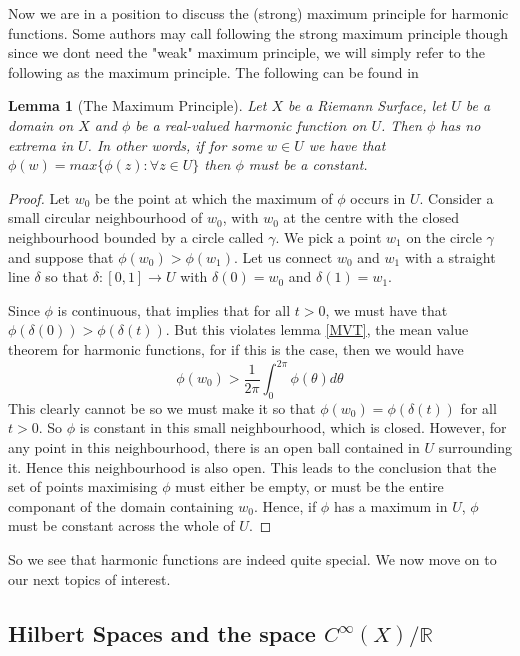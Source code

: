 \documentclass[a4paper,12pt]{report}
\theoremstyle{plain}
\newtheorem{lemma}[thm]{Lemma}
\theoremstyle{definition}
\begin{document}
Now we are in a position to discuss the (strong) maximum principle for harmonic functions. Some authors may call following the strong maximum principle though since we dont need the "weak" maximum principle, we will simply refer to the following as the maximum principle.
The following can be found in \cite{arnold}
\begin{lemma}[The Maximum Principle]\label{MaximumPrincipleDef}
  Let $X$ be a Riemann Surface, let $U$ be a domain on $X$ and $\phi$ be a real-valued harmonic function on $U$. Then $\phi$ has no extrema in $U$. In other words, if for some $w \in U$ we have that $\phi(w) = max\{\phi(z) \colon \forall z \in U\}$ then $\phi$ must be a constant.
\end{lemma}
\begin{proof}
  Let $w_0$ be the point at which the maximum of $\phi$ occurs in $U$. Consider a small circular neighbourhood of $w_0$, with $w_0$ at the centre with the closed neighbourhood bounded by a circle called $\gamma$. We pick a point $w_1$ on the circle $\gamma$ and suppose that $\phi(w_0)>\phi(w_1)$. Let us connect $w_0$ and $w_1$ with a straight line $\delta$ so that $\delta:[0,1] \rightarrow U$ with $\delta(0)=w_0$ and $\delta(1)=w_1$.
  
  Since $\phi$ is continuous, that implies that for all $t > 0$, we must have that $\phi(\delta(0)) > \phi(\delta(t))$. But this violates lemma \ref{MVT}, the mean value theorem for harmonic functions, for if this is the case, then we would have 
  \[ \phi(w_0) > \frac{1}{2\pi}\int_0^{2\pi}\phi(\theta)d\theta \]
  This clearly cannot be so we must make it so that $\phi(w_0) = \phi(\delta(t))$ for all $t > 0$. So $\phi$ is constant in this small neighbourhood, which is closed. However, for any point in this neighbourhood, there is an open ball contained in $U$ surrounding it. Hence this neighbourhood is also open. This leads to the conclusion that the set of points maximising $\phi$ must either be empty, or must be the entire componant of the domain containing $w_0$. Hence, if $\phi$ has a maximum in $U$, $\phi$ must be constant across the whole of $U$.
\end{proof}

So we see that harmonic functions are indeed quite special. We now move on to our next topics of interest.

\subsection{Hilbert Spaces and the space $C^{\infty}(X)/{\mathbb{R}}$}
\end{document}
